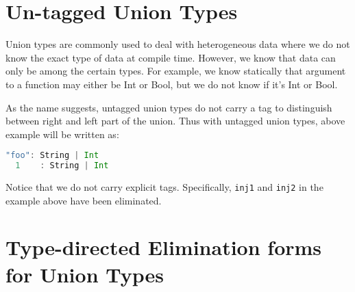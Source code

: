 



\section{Un-tagged Union Types}


Union types are commonly used to deal with heterogeneous data where we
do not know the exact type of data at compile time. However, we know
that data can only be among the certain types. For example, we know
statically that argument to a function may either be Int or Bool, but
we do not know if it's Int or Bool.

As the name suggests, untagged union types do not carry a tag
to distinguish between right and left part of the union.
Thus with untagged union types, above example will
be written as:

\begin{lstlisting}[language=Scala]
  "foo": String | Int
  1    : String | Int
\end{lstlisting}

Notice that we do not carry explicit tags.
Specifically, \lstinline{inj1} and \lstinline{inj2} in the example
above have been eliminated.








\section{Type-directed Elimination forms for Union Types}\label{subsec:elimination}

